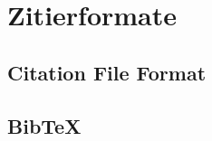 \section{Zitierformate}
\label{sec:zitierformate}
\subsection{Citation File Format}
\label{subsec:citation-file-format}
\subsection{Bib\TeX{}}
\label{subsec:bibtex_format}
